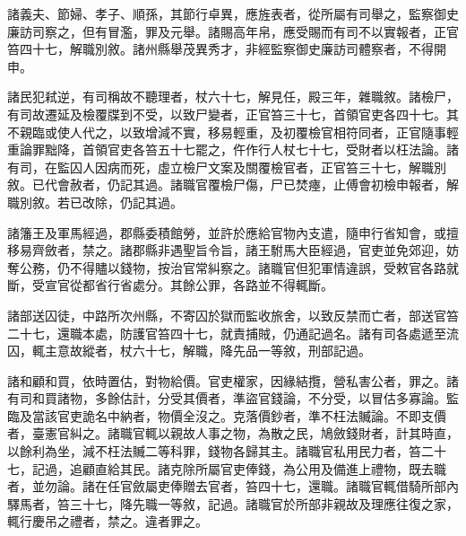 \begin{pinyinscope}
 諸義夫、節婦、孝子、順孫，其節行卓異，應旌表者，從所屬有司舉之，監察御史廉訪司察之，但有冒濫，罪及元舉。諸賜高年帛，應受賜而有司不以實報者，正官笞四十七，解職別敘。諸州縣舉茂異秀才，非經監察御史廉訪司體察者，不得開申。



 諸民犯弒逆，有司稱故不聽理者，杖六十七，解見任，殿三年，雜職敘。諸檢尸，有司故遷延及檢覆牒到不受，以致尸變者，正官笞三十七，首領官吏各四十七。其不親臨或使人代之，以致增減不實，移易輕重，及初覆檢官相符同者，正官隨事輕重論罪黜降，首領官吏各笞五十七罷之，仵作行人杖七十七，受財者以枉法論。諸有司，在監囚人因病而死，虛立檢尸文案及關覆檢官者，正官笞三十七，解職別敘。已代會赦者，仍記其過。諸職官覆檢尸傷，尸已焚瘞，止傅會初檢申報者，解職別敘。若已改除，仍記其過。



 諸籓王及軍馬經過，郡縣委積館勞，並許於應給官物內支遣，隨申行省知會，或擅移易齊斂者，禁之。諸郡縣非遇聖旨令旨，諸王駙馬大臣經過，官吏並免郊迎，妨奪公務，仍不得贐以錢物，按治官常糾察之。諸職官但犯軍情違誤，受敕官各路就斷，受宣官從都省行省處分。其餘公罪，各路並不得輒斷。



 諸部送囚徒，中路所次州縣，不寄囚於獄而監收旅舍，以致反禁而亡者，部送官笞二十七，還職本處，防護官笞四十七，就責捕賊，仍通記過名。諸有司各處遞至流囚，輒主意故縱者，杖六十七，解職，降先品一等敘，刑部記過。



 諸和顧和買，依時置估，對物給價。官吏權家，因緣結攬，營私害公者，罪之。諸有司和買諸物，多餘估計，分受其價者，準盜官錢論，不分受，以冒估多寡論。監臨及當該官吏詭名中納者，物價全沒之。克落價鈔者，準不枉法贓論。不即支價者，臺憲官糾之。諸職官輒以親故人事之物，為散之民，鳩斂錢財者，計其時直，以餘利為坐，減不枉法贓二等科罪，錢物各歸其主。諸職官私用民力者，笞二十七，記過，追顧直給其民。諸克除所屬官吏俸錢，為公用及備進上禮物，既去職者，並勿論。諸在任官斂屬吏俸贈去官者，笞四十七，還職。諸職官輒借騎所部內驛馬者，笞三十七，降先職一等敘，記過。諸職官於所部非親故及理應往復之家，輒行慶吊之禮者，禁之。違者罪之。



\end{pinyinscope}